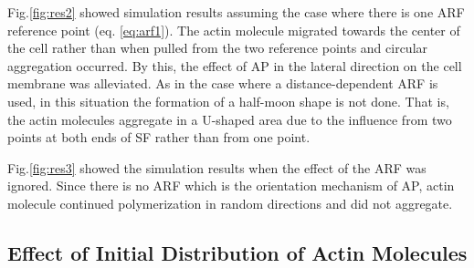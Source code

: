 \documentclass[a4paper,12pt, oneside]{book}
\begin{document}
Fig.\ref{fig:res2} showed simulation results assuming the case where there is one ARF reference point (eq. \ref{eq:arf1}).
The actin molecule migrated towards the center of the cell rather than when pulled from the two reference points and circular aggregation occurred.
By this, the effect of AP in the lateral direction on the cell membrane was alleviated.
As in the case where a distance-dependent ARF is used, in this situation the formation of a half-moon shape is not done.
That is, the actin molecules aggregate in a U-shaped area due to the influence from two points at both ends of SF rather than from one point.

Fig.\ref{fig:res3} showed the simulation results when the effect of the ARF was ignored.
Since there is no ARF which is the orientation mechanism of AP, actin molecule continued polymerization in random directions and did not aggregate.


\subsection{Effect of Initial Distribution of Actin Molecules}
\end{document}
